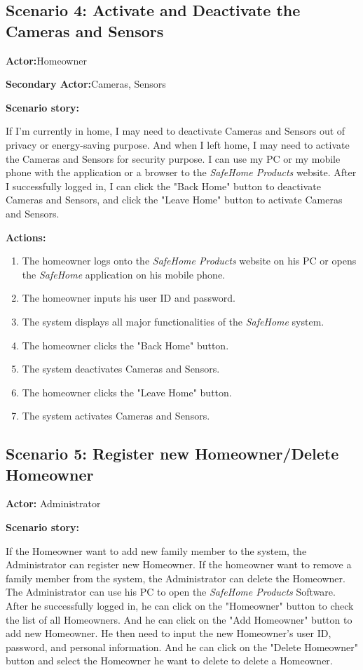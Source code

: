 \documentclass[twoside,11pt]{article}
\begin{document}

\subsection{Scenario 4: Activate and Deactivate the Cameras and Sensors}

\textbf{Actor:}Homeowner

\textbf{Secondary Actor:}Cameras, Sensors

\textbf{Scenario story:}

If I'm currently in home, I may need to deactivate Cameras and Sensors out of privacy or energy-saving purpose. And when I left home, I may need to activate the Cameras and Sensors for security purpose. I can use my PC or my mobile phone with the application or a browser to the \emph{SafeHome Products} website. After I successfully logged in, I can click the "Back Home" button to deactivate Cameras and Sensors, and click the "Leave Home" button to activate Cameras and Sensors.

\textbf{Actions:}

\begin{enumerate}
    \item The homeowner logs onto the \emph{SafeHome Products} website on his PC or opens the \emph{SafeHome} application on his mobile phone.
    \item The homeowner inputs his user ID and password.
    \item The system displays all major functionalities of the \emph{SafeHome} system.
    \item The homeowner clicks the "Back Home" button.
    \item The system deactivates Cameras and Sensors.
    \item The homeowner clicks the "Leave Home" button.
    \item The system activates Cameras and Sensors.
\end{enumerate}


\subsection{Scenario 5: Register new Homeowner/Delete Homeowner}

\textbf{Actor:} Administrator

\textbf{Scenario story:}

If the Homeowner want to add new family member to the system, the Administrator can register new Homeowner. If the homeowner want to remove a family member from the system, the Administrator can delete the Homeowner. The Administrator can use his PC to open the \emph{SafeHome Products} Software. After he successfully logged in, he can click on the "Homeowner" button to check the list of all Homeowners. And he can click on the "Add Homeowner" button to add new Homeowner. He then need to input the new Homeowner's user ID, password, and personal information. And he can click on the "Delete Homeowner" button and select the Homeowner he want to delete to delete a Homeowner.
\end{document}
